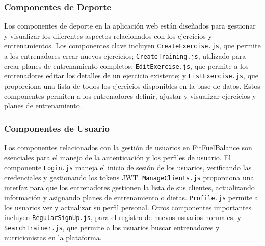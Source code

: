 \subsubsection{Componentes de Deporte}
Los componentes de deporte  en la aplicación web están diseñados para gestionar y visualizar los diferentes aspectos relacionados con los ejercicios y entrenamientos. Los componentes clave incluyen \texttt{CreateExercise.js}, que permite a los entrenadores crear nuevos ejercicios; \texttt{CreateTraining.js}, utilizado para crear planes de entrenamiento completos; \texttt{EditExercise.js}, que permite a los entrenadores editar los detalles de un ejercicio existente; y \texttt{ListExercise.js}, que proporciona una lista de todos los ejercicios disponibles en la base de datos. Estos componentes permiten a los entrenadores definir, ajustar y visualizar ejercicios y planes de entrenamiento.

\subsubsection{Componentes de Usuario}
Los componentes relacionados con la gestión de usuarios  en FitFuelBalance son esenciales para el manejo de la autenticación y los perfiles de usuario. El componente \texttt{Login.js} maneja el inicio de sesión de los usuarios, verificando las credenciales y gestionando los tokens JWT. \texttt{ManageClients.js} proporciona una interfaz para que los entrenadores gestionen la lista de sus clientes, actualizando información y asignando planes de entrenamiento o dietas. \texttt{Profile.js} permite a los usuarios ver y actualizar su perfil personal. Otros componentes importantes incluyen \texttt{RegularSignUp.js}, para el registro de nuevos usuarios normales, y \texttt{SearchTrainer.js}, que permite a los usuarios buscar entrenadores y nutricionistas en la plataforma.
